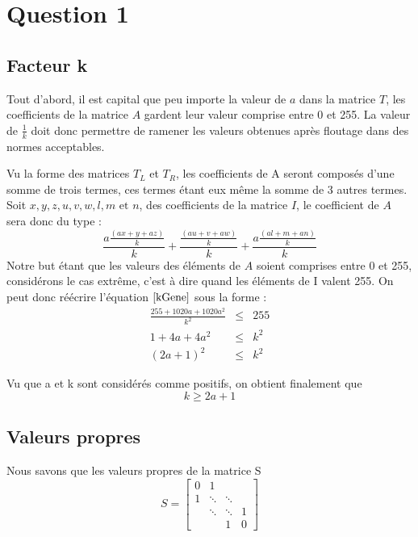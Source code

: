 \section{Question 1}

\subsection{Facteur k}
	Tout d'abord, il  est capital que peu importe la valeur de $\textit{a}$ dans la matrice $\textit{T}$, les coefficients de la matrice $\textit{A}$ gardent leur valeur comprise entre 0 et 255. La valeur de $\frac{1}{k}$ doit donc permettre de ramener les valeurs obtenues après floutage dans des normes acceptables.
	
	Vu la forme des matrices $T_L$ et $T_R$, les coefficients de A seront composés d'une somme de trois termes, ces termes étant eux même la somme de 3 autres termes. Soit $x,y,z, u, v, w, l, m \text{ et } n$, des coefficients de la matrice $I$, le coefficient de $A$ sera donc du type :
	\begin{equation} \label{kGene}
	\frac{a \frac{(ax+y+az)}{k}}{k} + \frac{\frac{(au+v+aw)}{k}}{k} + \frac{a \frac{(al+m+an)}{k}}{k}
	\end{equation}
Notre but étant que les valeurs des éléments de $A$	soient comprises entre 0 et 255, considérons le cas extrême, c'est à dire quand les éléments de I valent 255. On peut donc réécrire l'équation $\ref{kGene}$ sous la forme : 	\begin{eqnarray}
\frac{255+1020a+1020a^2}{k^2} &\leq & 255 \\
1+4a+4a^2 &\leq & k^2 \\
(2a+1)^2 &\leq & k^2
\end{eqnarray}
	
Vu que a et k sont considérés comme positifs, on obtient finalement que 	
	\begin{equation}
	k \geq 2a+1
	\end{equation}
	
\subsection{Valeurs propres}
	Nous savons que les valeurs propres de la matrice S 
	$$
S = 	
 \left[
 \begin{array}{cccc}
    0 & 1 		& 			& \\
    1 & \ddots 	& \ddots 	& \\
      & \ddots 	& \ddots 	& 1 \\
      & 		& 1			& 0
  \end{array}
  \right]
$$

